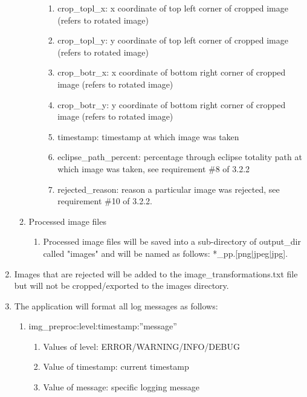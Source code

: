 \documentclass[10pt, onecolumn, draftclsnofoot, letterpaper, compsoc]{IEEEtran}
\begin{document}
\begin{enumerate}
\begin{enumerate}
\begin{enumerate}
\begin{enumerate}
		 			\item crop\_topl\_x: x coordinate of top left corner of
		 			cropped image (refers to rotated image)

		 			\item crop\_topl\_y: y coordinate of top left corner of
		 			cropped image (refers to rotated image)

		 			\item crop\_botr\_x: x coordinate of bottom right corner of
		 			cropped image (refers to rotated image)

		 			\item crop\_botr\_y: y coordinate of bottom right corner of
		 			 cropped image (refers to rotated image)

		 			\item timestamp: timestamp at which image was taken

		 			\item eclipse\_path\_percent: percentage through eclipse
		 			totality path at which image was taken, see requirement \#8
		 			 of 3.2.2

		 			 \item rejected\_reason: reason a particular image was rejected,
		 			 see requirement \#10 of 3.2.2.
		 		\end{enumerate}
		 	\end{enumerate}
			\item Processed image files
				\begin{enumerate}
					 \item Processed image files will be saved into a sub-directory
					 of output\_dir called "images" and will be named as follows:
					 *\_pp.[png$\vert$jpeg$\vert$jpg].
				\end{enumerate}
		 \end{enumerate}

		 \item Images that are rejected will  be added to the
		 image\_transformations.txt file but will not be cropped/exported to
		 the images directory.

		 \item The application will format all log messages as follows:
		 \begin{enumerate}
		 	\item img\_preproc:level:timestamp:”message”
		 	\begin{enumerate}
		 		\item Values of level: ERROR/WARNING/INFO/DEBUG
		 		\item Value of timestamp: current timestamp
		 		\item Value of message: specific logging message
		 	\end{enumerate}
		 \end{enumerate}
	\end{enumerate}
\end{document}
